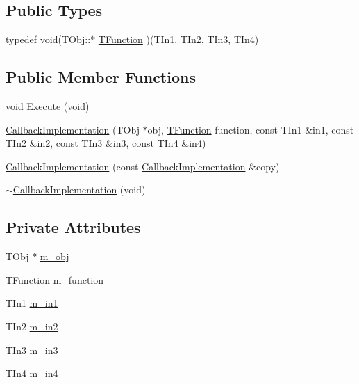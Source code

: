 \subsection*{Public Types}
\begin{DoxyCompactItemize}
\item 
typedef void(T\-Obj\-::$\ast$ \hyperlink{class_callback_implementation_ad435dd89094bf90ed2f1cf7b19f055c9}{T\-Function} )(T\-In1, T\-In2, T\-In3, T\-In4)
\end{DoxyCompactItemize}
\subsection*{Public Member Functions}
\begin{DoxyCompactItemize}
\item 
void \hyperlink{class_callback_implementation_a2ecce192edc055cdc55333c185ea82fe}{Execute} (void)
\item 
\hyperlink{class_callback_implementation_a962ad97d50ccae1d96e302f3c377d790}{Callback\-Implementation} (T\-Obj $\ast$obj, \hyperlink{class_callback_implementation_ad435dd89094bf90ed2f1cf7b19f055c9}{T\-Function} function, const T\-In1 \&in1, const T\-In2 \&in2, const T\-In3 \&in3, const T\-In4 \&in4)
\item 
\hyperlink{class_callback_implementation_a8313e1c41c97ec3e9212b9d337f601e1}{Callback\-Implementation} (const \hyperlink{class_callback_implementation}{Callback\-Implementation} \&copy)
\item 
\hyperlink{class_callback_implementation_a2f30233acb9303b2e04d46220ff055c5}{$\sim$\-Callback\-Implementation} (void)
\end{DoxyCompactItemize}
\subsection*{Private Attributes}
\begin{DoxyCompactItemize}
\item 
T\-Obj $\ast$ \hyperlink{class_callback_implementation_a4be5b9ca1d3efb3f42fbf27f2fe9c533}{m\-\_\-obj}
\item 
\hyperlink{class_callback_implementation_ad435dd89094bf90ed2f1cf7b19f055c9}{T\-Function} \hyperlink{class_callback_implementation_a0b1fb594eda22cad7ac6b90f204c753e}{m\-\_\-function}
\item 
T\-In1 \hyperlink{class_callback_implementation_aa450e142f5f6b9a21d586cac4d678278}{m\-\_\-in1}
\item 
T\-In2 \hyperlink{class_callback_implementation_a47a012cc680635d68292e21e06a0b571}{m\-\_\-in2}
\item 
T\-In3 \hyperlink{class_callback_implementation_a5fe21028d85ca42abc4bd1c40b51e433}{m\-\_\-in3}
\item 
T\-In4 \hyperlink{class_callback_implementation_a2bfee544e8870c3f55bdaad8bb4102ec}{m\-\_\-in4}
\end{DoxyCompactItemize}
